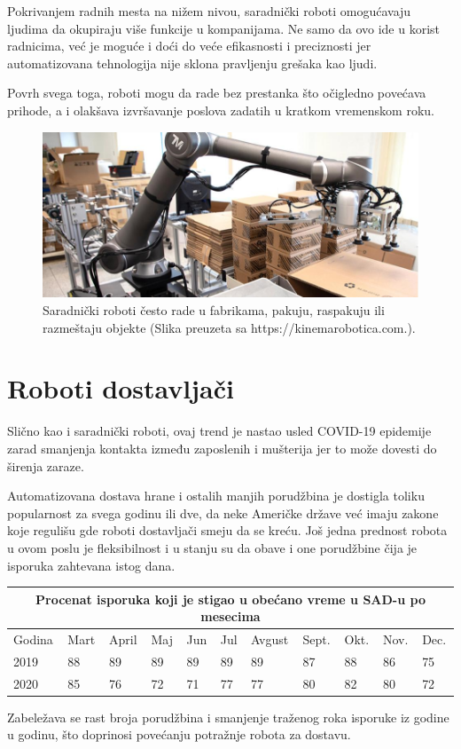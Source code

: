 \documentclass{report}
\begin{document}
Pokrivanjem radnih mesta na nižem nivou, saradnički roboti omogućavaju ljudima da okupiraju više funkcije u kompanijama. Ne samo da ovo ide u korist radnicima, već je moguće i doći do veće efikasnosti i preciznosti jer automatizovana tehnologija nije sklona pravljenju grešaka kao ljudi.

Povrh svega toga, roboti mogu da rade bez prestanka što očigledno povećava prihode, a i olakšava izvršavanje poslova zadatih u kratkom vremenskom roku. \cite{cobots}

\begin{figure}
\centering
\includegraphics[scale=0.41]{Cobot.jpg}
\caption{Saradnički roboti često rade u fabrikama, pakuju, raspakuju ili razmeštaju objekte (Slika preuzeta sa https://kinemarobotica.com.).}
\end{figure}

\chapter{Roboti dostavljači}
Slično kao i saradnički roboti, ovaj trend je nastao usled COVID-19 epidemije zarad smanjenja kontakta između zaposlenih i mušterija jer to može dovesti do širenja zaraze.

Automatizovana dostava hrane i ostalih manjih porudžbina je dostigla toliku popularnost za svega godinu ili dve, da neke Američke države već imaju zakone koje regulišu gde roboti dostavljači smeju da se kreću. Još jedna prednost robota u ovom poslu je fleksibilnost i u stanju su da obave i one porudžbine čija je isporuka zahtevana istog dana.
\vspace{0.25cm}
\begin{center}
\begin{tabular}{ |p{1cm}|p{1cm}|p{1cm}|p{1cm} |p{1cm}|p{1cm}|p{1cm}|p{1cm}|p{1cm}|p{1cm}|p{1cm}|}
\hline
\multicolumn{11}{|c|}{Procenat isporuka koji je stigao u obećano vreme u SAD-u po mesecima} \\
\hline
Godina & Mart & April & Maj & Jun & Jul & Avgust & Sept. & Okt. & Nov. & Dec. \\
\hline
2019 & 88 & 89 & 89 & 89 & 89 & 89 & 87 & 88 & 86 & 75 \\
2020 & 85 & 76 & 72 & 71 & 77 & 77 & 80 & 82 & 80 & 72 \\
\hline
\end{tabular}
\end{center}
\vspace{0.25cm}
Zabeležava se rast broja porudžbina i smanjenje traženog roka isporuke iz godine u godinu, što doprinosi povećanju potražnje robota za dostavu. \cite{robotics2022, sameday}  
\end{document}
